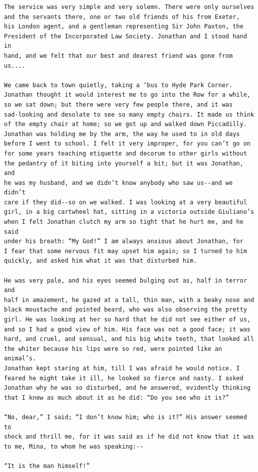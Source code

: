 \documentclass{article}
\begin{document}
\begin{verbatim}
The service was very simple and very solemn. There were only ourselves
and the servants there, one or two old friends of his from Exeter,
his London agent, and a gentleman representing Sir John Paxton, the
President of the Incorporated Law Society. Jonathan and I stood hand in
hand, and we felt that our best and dearest friend was gone from us....

We came back to town quietly, taking a ’bus to Hyde Park Corner.
Jonathan thought it would interest me to go into the Row for a while,
so we sat down; but there were very few people there, and it was
sad-looking and desolate to see so many empty chairs. It made us think
of the empty chair at home; so we got up and walked down Piccadilly.
Jonathan was holding me by the arm, the way he used to in old days
before I went to school. I felt it very improper, for you can’t go on
for some years teaching etiquette and decorum to other girls without
the pedantry of it biting into yourself a bit; but it was Jonathan, and
he was my husband, and we didn’t know anybody who saw us--and we didn’t
care if they did--so on we walked. I was looking at a very beautiful
girl, in a big cartwheel hat, sitting in a victoria outside Giuliano’s
when I felt Jonathan clutch my arm so tight that he hurt me, and he said
under his breath: “My God!” I am always anxious about Jonathan, for
I fear that some nervous fit may upset him again; so I turned to him
quickly, and asked him what it was that disturbed him.

He was very pale, and his eyes seemed bulging out as, half in terror and
half in amazement, he gazed at a tall, thin man, with a beaky nose and
black moustache and pointed beard, who was also observing the pretty
girl. He was looking at her so hard that he did not see either of us,
and so I had a good view of him. His face was not a good face; it was
hard, and cruel, and sensual, and his big white teeth, that looked all
the whiter because his lips were so red, were pointed like an animal’s.
Jonathan kept staring at him, till I was afraid he would notice. I
feared he might take it ill, he looked so fierce and nasty. I asked
Jonathan why he was so disturbed, and he answered, evidently thinking
that I knew as much about it as he did: “Do you see who it is?”

“No, dear,” I said; “I don’t know him; who is it?” His answer seemed to
shock and thrill me, for it was said as if he did not know that it was
to me, Mina, to whom he was speaking:--

“It is the man himself!”


\end{verbatim}
\end{document}

